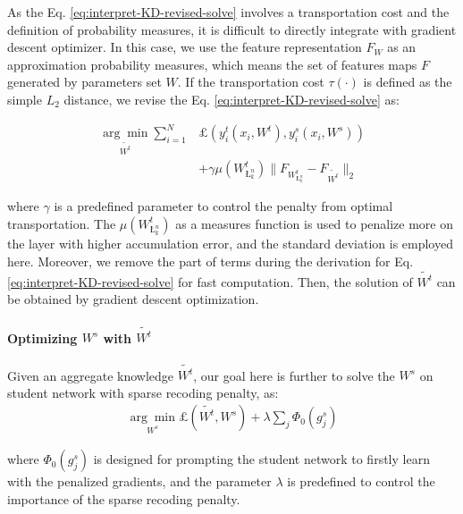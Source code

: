 \documentclass[10pt,twocolumn,letterpaper]{article}
\begin{document}
As the Eq. \ref{eq:interpret-KD-revised-solve} involves a transportation cost
and the definition of probability measures,
it is difficult to directly integrate with gradient descent optimizer.
In this case,
we use the feature representation $\textit{F}_W$ as an approximation probability measures,
which means the set of features maps $\textit{F}$ generated by parameters set $W$.
If the transportation cost $\tau(\cdot)$ is defined as the simple $L_2$ distance,
we revise the Eq. \ref{eq:interpret-KD-revised-solve} as:

\begin{equation}
\begin{split}
\underset{\tilde{W^t}}{\arg\min} \sum_{i=1}^{N}&\pounds(y_{i}^{t}(x_i, W^t), y_{i}^{s}(x_i, W^s))\\
&+ \gamma \mu(W^t_{\textit{\L}_k^n})\|\textit{F}_{W^t_{\textit{\L}_k^n}} - \textit{F}_{\tilde{W^t}}\|_2
\label{eq:interpret-KD-further-revised-solved}
\end{split}
\end{equation}

where $\gamma$ is a predefined parameter to control the penalty from optimal transportation.
The $\mu(W^t_{\textit{\L}_k^n})$ as a measures function is used to
penalize more on the layer with higher accumulation error,
and the standard deviation is employed here.
Moreover, we remove the part of terms during the derivation
for Eq. \ref{eq:interpret-KD-revised-solve} for fast computation.
Then, the solution of $\tilde{W^t}$ can be obtained by gradient descent optimization.

\paragraph{Optimizing $W^s$ with $\tilde{W^t}$}
Given an aggregate knowledge $\tilde{W^t}$,
our goal here is further to solve the $W^s$ on student network with sparse recoding penalty,
as:
\begin{equation}
\begin{split}
\underset{W^s}{\arg\min} \pounds(\tilde{W^t}, W^s) + \lambda \sum_{j}\Phi_0(g_{j}^{s})
\label{eq:interpret-KD-revised-split2}
\end{split}
\end{equation}

where $\Phi_0(g_{j}^{s})$ is designed for
prompting the student network to firstly learn with the penalized gradients,
and the parameter $\lambda$ is predefined to control
the importance of the sparse recoding penalty.
\end{document}
